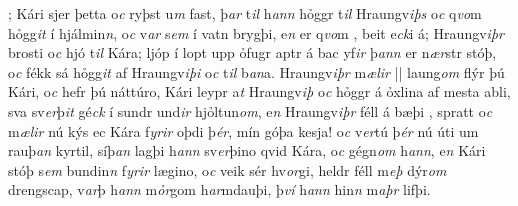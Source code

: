  ; 
Kári sjer  þetta o\textit{c} ryþst u\textit{m} fast, þ\textit{ar} t\textit{il} h\textit{ann} hỏggr t\textit{il} Hraungv\textit{iþs} o\textit{c} q\textit{vo}m  hỏgg\textit{it} í hjálmin\textit{n}, 
o\textit{c} v\textit{ar}  s\textit{em} í vatn brygþi, 
e\textit{n} er q\textit{vo}m  , beit e\textit{ck}i á; 
Hraungv\textit{iþr} brosti o\textit{c} hjó t\textit{il} Kára; 
  ljóp í lopt upp ỏfugr aptr á bac yf\textit{ir}
þ\textit{an}\textit{n} er n\textit{ær}str stóþ, o\textit{c} fékk sá hỏgg\textit{it} af Hraungv\textit{iþi} o\textit{c}  t\textit{il} b\textit{an}a. 
Hraungv\textit{iþr} m\textit{ælir} 
||
laung\textit{om} flýr þú Kári, o\textit{c} hefr þú  náttúro,
Kári leypr a\textit{t} Hraungv\textit{iþ} o\textit{c} hỏggr á ỏxlina af mesta  abli, 
sva sv\textit{er}þ\textit{it} gé\textit{ck} í sundr und\textit{ir} hjỏltun\textit{om}, 
e\textit{n} Hraungv\textit{iþr} féll á bæþi  ,   spratt   o\textit{c} m\textit{ælir} nú kýs ec Kára f\textit{yrir} oþdi
þ\textit{ér}, mín góþa kesja! o\textit{c} v\textit{er}tú þ\textit{ér} nú úti
um rauþ\textit{an} kyrtil, síþ\textit{an} lagþi h\textit{ann}
sv\textit{er}þino   qvid Kára, o\textit{c}  gégn\textit{om} h\textit{ann}, e\textit{n} Kári stóþ s\textit{em}
bundin\textit{n}  f\textit{yrir} lægino, o\textit{c} veik sér hv\textit{or}gi,
heldr féll m\textit{eþ} dýr\textit{om} drengscap, v\textit{ar}þ h\textit{ann}
m\textit{ỏr}gom h\textit{ar}mdauþi, þ\textit{ví} h\textit{ann}  hin\textit{n}  m\textit{aþr}     lifþi.
\pend \endnumbering  


